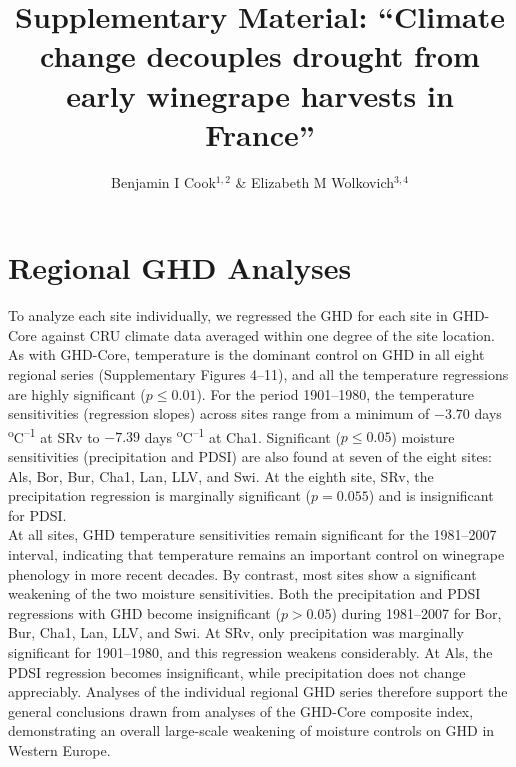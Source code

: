 \documentclass[12pt]{article}
\title{Supplementary Material: 
``Climate change decouples drought from early winegrape harvests in France''}
\author{Benjamin I Cook$^{1,2}$ \& Elizabeth M Wolkovich$^{3,4}$}
\begin{document}
\maketitle

\section*{Regional GHD Analyses}
\noindent To analyze each site individually, we regressed the GHD for each site in GHD-Core against CRU climate data averaged within one degree of the site location. As with GHD-Core, temperature is the dominant control on GHD in all eight regional series (Supplementary Figures 4--11), and all the temperature regressions are highly significant ($p\le0.01$). For the period 1901--1980, the temperature sensitivities (regression slopes) across sites range from a minimum of $-3.70$ days \textsuperscript{o}C\textsuperscript{--1} at SRv to $-7.39$ days \textsuperscript{o}C\textsuperscript{--1} at Cha1. Significant ($p\le0.05$) moisture sensitivities (precipitation and PDSI) are also found at seven of the eight sites: Als, Bor, Bur, Cha1, Lan, LLV, and Swi. At the eighth site, SRv, the precipitation regression is marginally significant ($p=0.055$) and is insignificant for PDSI.\\
\indent At all sites, GHD temperature sensitivities remain significant for the 1981--2007 interval, indicating that temperature remains an important control on winegrape phenology in more recent decades. By contrast, most sites show a significant weakening of the two moisture sensitivities. Both the precipitation and PDSI regressions with GHD become insignificant ($p>0.05$) during 1981--2007 for Bor, Bur, Cha1, Lan, LLV, and Swi. At SRv, only precipitation was marginally significant for 1901--1980, and this regression weakens considerably. At Als, the PDSI regression becomes insignificant, while precipitation does not change appreciably. Analyses of the individual regional GHD series therefore support the general conclusions drawn from analyses of the GHD-Core composite index, demonstrating an overall large-scale weakening of moisture controls on GHD in Western Europe.
\end{document}
